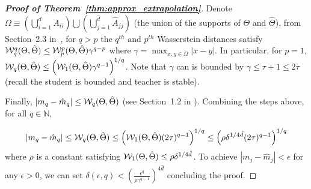 \begin{proof}[\textbf{Proof of Theorem~\ref{thm:approx_extrapolation}}]
Denote $\Omega\equiv \left(\bigcup_{i=1}^{d} A_{ii}\right) \bigcup \left(\bigcup_{j=1}^{\hat{d}}\hat{A}_{jj}\right)$ (the union of the supports of $\Theta$ and $\hat{\Theta}$), from Section~2.3 in~\cite{panaretos2019statistical}, for $q>p$ the $q^{th}$ and $p^{th}$ Wasserstein distances satisfy $\mathcal{W}_q^q(\Theta,\hat{\Theta})\le \mathcal{W}_p^p(\Theta,\hat{\Theta}) \gamma^{q-p}$ where $\gamma=\max_{x,y\in\Omega} |x-y|$. In particular, for $p=1$, $\mathcal{W}_q(\Theta,\hat{\Theta})\le \left(\mathcal{W}_1(\Theta,\hat{\Theta}) \gamma^{q-1}\right)^{1/q}$.
Note that $\gamma$ can is bounded by $\gamma\le\tau+1\le 2\tau$ (recall the student is bounded and teacher is stable).



Finally, $|m_q-\hat{m}_q|\le  \mathcal{W}_q(\Theta,\hat{\Theta})$  (see Section~1.2 in \cite{biswas2021bounding}).
Combining the steps above, for all $q\in\mathbb{N}$,

\begin{equation}
    |m_q-\hat{m}_q|\le \mathcal{W}_q(\Theta,\hat{\Theta})\le \left(\mathcal{W}_1(\Theta,\hat{\Theta}) (2\tau)^{q-1}\right)^{1/q}\le \left(\rho \delta^{1/4\hat{d}}(2\tau)^{q-1}\right)^{1/q}
\end{equation}
where $\rho$ is a constant satisfying $\mathcal{W}_1(\Theta,\hat{\Theta})\le \rho\delta^{1/4\hat{d}}$. To achieve $|m_j-\hat{m}_j|<\epsilon$ for any $\epsilon>0$, we can set $\delta(\epsilon,q)<\left(\frac{\epsilon^q}{\rho\gamma^{q-1}}\right)^{4\hat{d}}$ concluding the proof.
















\end{proof}
